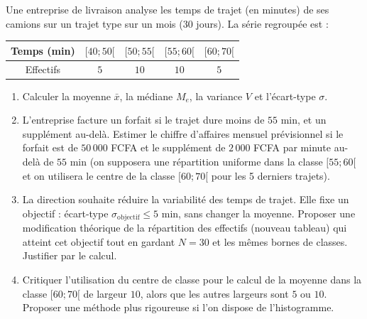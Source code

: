 \documentclass[11pt]{article}
\begin{document}
\begin{exercice}
Une entreprise de livraison analyse les temps de trajet (en minutes) de ses camions sur un trajet type sur un mois ($30$ jours). La série regroupée est :

\begin{center}
\begin{tabular}{|c|c|c|c|c|}
\hline
Temps (min) & $[40; 50[$ & $[50; 55[$ & $[55; 60[$ & $[60; 70[$ \\
\hline
Effectifs & $5$ & $10$ & $10$ & $5$ \\
\hline
\end{tabular}
\end{center}

\begin{enumerate}
    \item Calculer la moyenne $\bar{x}$, la médiane $M_e$, la variance $V$ et l'écart-type $\sigma$.
    \item L'entreprise facture un forfait si le trajet dure moins de $55$ min, et un supplément au-delà. Estimer le chiffre d'affaires mensuel prévisionnel si le forfait est de $50\,000$ FCFA et le supplément de $2\,000$ FCFA par minute au-delà de $55$ min (on supposera une répartition uniforme dans la classe $[55; 60[$ et on utilisera le centre de la classe $[60; 70[$ pour les 5 derniers trajets).
    \item La direction souhaite réduire la variabilité des temps de trajet. Elle fixe un objectif : écart-type $\sigma_{\text{objectif}} \le 5$ min, sans changer la moyenne. Proposer une modification théorique de la répartition des effectifs (nouveau tableau) qui atteint cet objectif tout en gardant $N=30$ et les mêmes bornes de classes. Justifier par le calcul.
    \item Critiquer l'utilisation du centre de classe pour le calcul de la moyenne dans la classe $[60; 70[$ de largeur $10$, alors que les autres largeurs sont $5$ ou $10$. Proposer une méthode plus rigoureuse si l'on dispose de l'histogramme.
\end{enumerate}
\end{exercice}
\end{document}
